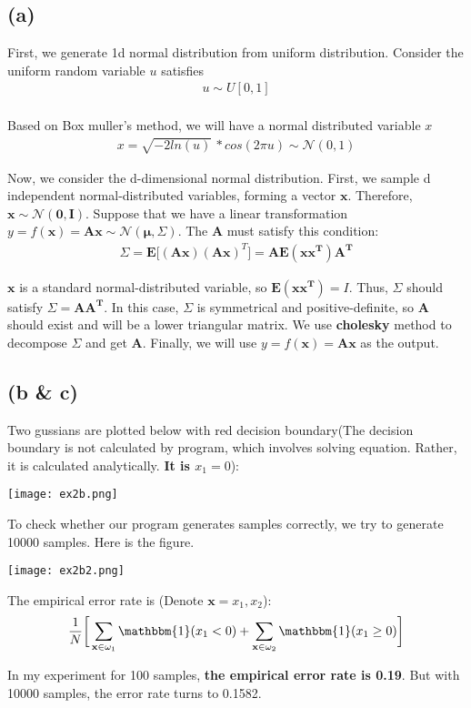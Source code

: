 \documentclass{article}
\renewcommand{\part}[1]{\subsection*{(#1)}}
\begin{document}
\part{a}
First, we generate 1d normal distribution from uniform distribution. Consider the uniform random variable $u$ satisfies
\begin{align*}
  u \sim U [0, 1] \\
\end{align*} \par
Based on Box muller's method, we will have a normal distributed variable $x$
\begin{align*}
  x = \sqrt{-2ln(u)} \, * cos(2\pi u) \sim \mathcal N (0, 1)
\end{align*} \par
Now, we consider the d-dimensional normal distribution. First, we sample d independent normal-distributed variables, forming a vector $\mathbf{x}$. Therefore, $\mathbf{x} \sim \mathcal N (\mathbf{0}, \mathbf{I})$. Suppose that we have a linear transformation $y = f(\mathbf{x}) = \mathbf{Ax} \sim \mathcal N(\mathbf{\mu}, \Sigma)$. The $\mathbf{A}$ must satisfy this condition:
\begin{align*}
  \Sigma = \mathbf{E} \big[ (\mathbf{Ax})(\mathbf{Ax})^{T} \big] = \mathbf{AE}(\mathbf{xx^T})\mathbf{A^T}
\end{align*} \par
$\mathbf{x}$ is a standard normal-distributed variable, so $\mathbf{E}(\mathbf{xx^T}) = I$. Thus, $\Sigma$ should satisfy $\Sigma = \mathbf{A}\mathbf{A^T}$. In this case, $\Sigma$ is symmetrical and positive-definite, so $\mathbf{A}$ should exist and will be a lower triangular matrix. We use \textbf{cholesky} method to decompose $\Sigma$ and get $\mathbf{A}$. Finally, we will use $y = f(\mathbf{x}) = \mathbf{Ax}$ as the output.

\part{b \& c}
Two gussians are plotted below with red decision boundary(The decision boundary is not calculated by program, which involves solving equation. Rather, it is calculated analytically. \textbf{It is $x_1 = 0$}):
\begin{center}
  \texttt{[image: ex2b.png]}
\end{center} \par
To check whether our program generates samples correctly, we try to generate 10000 samples. Here is the figure.
\begin{center}
  \texttt{[image: ex2b2.png]}
\end{center} \par
The empirical error rate is (Denote $\mathbf{x} = {x_1, x_2} $):
\begin{align*}
  \frac{1}{N} \bigg[ \displaystyle\sum_{\mathbf{x} \in \omega_1} \mathbbm{1}(x_1 < 0) + \displaystyle\sum_{\mathbf{x} \in \omega_2} \mathbbm{1}(x_1 \ge 0) \bigg]
\end{align*} \par
In my experiment for 100 samples, \textbf{the empirical error rate is 0.19}. But with 10000 samples, the error rate turns to 0.1582.
\end{document}
